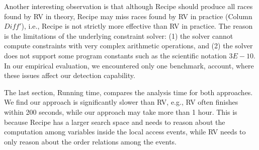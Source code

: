  

Another interesting observation is that although {\sf Recipe} should 
produce all races found by {\sf RV} in theory, {\sf Recipe} may miss 
races found by {\sf RV} in practice (Column $Diff'$), i.e., {\sf Recipe} 
is not strictly more effective than {\sf RV} in practice. The reason  is 
the limitations of the underlying constraint solver: (1) the solver cannot 
compute constraints with very complex arithmetic operations, and (2) the 
solver does not support some program constants such as the scientific 
notation $3E-10$. In our empirical evaluation, we encountered only one 
benchmark, {\sf account}, where these issues affect our detection capability.

The last section, Running time, compares the analysis time for both 
approaches. We find our approach is significantly slower than {\sf RV}, 
e.g., {\sf RV} often finishes within 200 seconds, while our approach may 
take more than 1 hour. This is because {\sf Recipe} has a larger search 
space and needs to reason about the computation among variables inside 
the local access events, while {\sf RV} needs to only reason about 
the order relations among the events.


 











